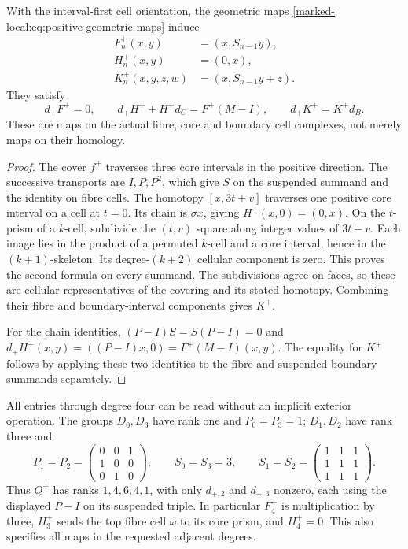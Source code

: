 \begin{theorem}\label{marked-local:thm:positive-chains}
With the interval-first cell orientation, the geometric maps
\eqref{marked-local:eq:positive-geometric-maps} induce
\begin{equation}\label{marked-local:eq:positive-FHK}
 \begin{split}
 F^+_n(x,y)&=(x,S_{n-1}y),\\
 H^+_n(x,y)&=(0,x),\\
 K^+_n(x,y,z,w)&=(x,S_{n-1}y+z).
 \end{split}
\end{equation}
They satisfy
\begin{equation}\label{marked-local:eq:positive-identities}
 d_+F^+=0,\qquad d_+H^++H^+d_C=F^+(M-I),
 \qquad d_+K^+=K^+d_B.
\end{equation}
These are maps on the actual fibre, core and boundary cell complexes,
not merely maps on their homology.
\end{theorem}
\begin{proof}
The cover $f^+$ traverses three core intervals in the positive
direction. The successive transports are $I,P,P^2$, which give
$S$ on the suspended summand and the identity on fibre cells.
The homotopy $[x,3t+v]$ traverses one positive core interval on
a cell at $t=0$. Its chain is $\sigma x$, giving $H^+(x,0)=(0,x)$.
On the $t$-prism of a $k$-cell, subdivide the $(t,v)$ square along
integer values of $3t+v$. Each image lies in the product of a
permuted $k$-cell and a core interval, hence in the $(k+1)$-skeleton.
Its degree-$(k+2)$ cellular component is zero. This proves the second
formula on every summand. The subdivisions agree on faces, so these
are cellular representatives of the covering and its stated homotopy.
Combining their fibre and boundary-interval components gives $K^+$.

For the chain identities, $(P-I)S=S(P-I)=0$ and
$d_+H^+(x,y)=((P-I)x,0)=F^+(M-I)(x,y)$.
The equality for $K^+$ follows by applying these two identities to
the fibre and suspended boundary summands separately.
\end{proof}

All entries through degree four can be read without an implicit
exterior operation. The groups $D_0,D_3$ have rank one and
$P_0=P_3=1$; $D_1,D_2$ have rank three and
\[
 P_1=P_2=\begin{pmatrix}0&0&1\\1&0&0\\0&1&0\end{pmatrix},
 \qquad S_0=S_3=3,\qquad
 S_1=S_2=\begin{pmatrix}1&1&1\\1&1&1\\1&1&1\end{pmatrix}.
\]
Thus $Q^+$ has ranks $1,4,6,4,1$, with only $d_{+,2}$ and
$d_{+,3}$ nonzero, each using the displayed $P-I$ on its suspended
triple. In particular $F^+_4$ is multiplication by three, $H^+_3$
sends the top fibre cell $\omega$ to its core prism, and $H^+_4=0$.
This also specifies all maps in the requested adjacent degrees.

